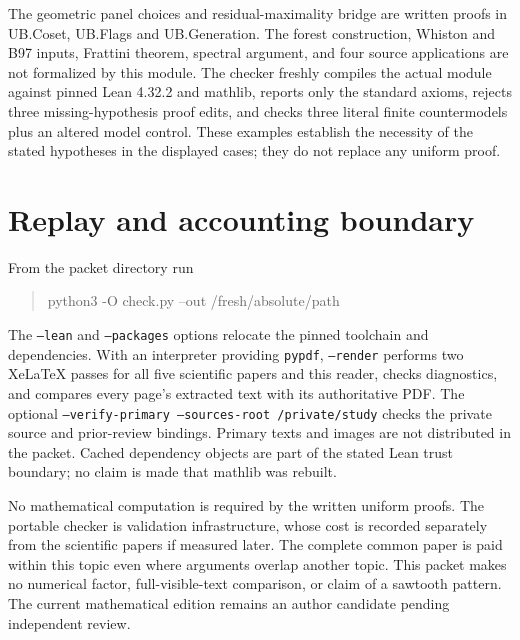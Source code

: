 The geometric panel choices and residual-maximality bridge are written
proofs in UB.Coset, UB.Flags and UB.Generation. The forest construction,
Whiston and B97 inputs, Frattini theorem, spectral argument, and four
source applications are not formalized by this module. The checker
freshly compiles the actual module against pinned Lean 4.32.2 and mathlib,
reports only the standard axioms, rejects three missing-hypothesis proof
edits, and checks three literal finite countermodels plus an altered
model control. These examples establish the necessity of the stated
hypotheses in the displayed cases; they do not replace any uniform proof.

\section{Replay and accounting boundary}
From the packet directory run
\begin{quote}\ttfamily
python3 -O check.py --out /fresh/absolute/path
\end{quote}
The \texttt{--lean} and \texttt{--packages} options relocate the pinned
toolchain and dependencies. With an interpreter providing \texttt{pypdf},
\texttt{--render} performs two XeLaTeX passes for all five scientific
papers and this reader, checks diagnostics, and compares every page's
extracted text with its authoritative PDF. The optional
\texttt{--verify-primary --sources-root /private/study} checks the
private source and prior-review bindings. Primary texts and images are
not distributed in the packet. Cached dependency objects are part of
the stated Lean trust boundary; no claim is made that mathlib was rebuilt.

No mathematical computation is required by the written uniform proofs.
The portable checker is validation infrastructure, whose cost is recorded
separately from the scientific papers if measured later. The complete
common paper is paid within this topic even where arguments overlap
another topic. This packet makes no numerical factor, full-visible-text
comparison, or claim of a sawtooth pattern. The current mathematical
edition remains an author candidate pending independent review.

